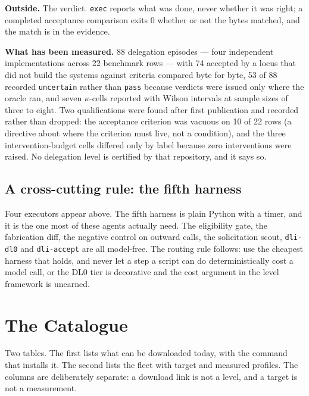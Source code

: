 \textbf{Outside.} The verdict. \texttt{exec} reports what was done, never whether it was right; a completed acceptance comparison exits 0 whether or not the bytes matched, and the match is in the evidence.

\textbf{What has been measured.} 88 delegation episodes --- four independent implementations across 22 benchmark rows --- with 74 accepted by a locus that did not build the systems against criteria compared byte for byte, 53 of 88 recorded \texttt{uncertain} rather than \texttt{pass} because verdicts were issued only where the oracle ran, and seven $\kappa$-cells reported with Wilson intervals at sample sizes of three to eight. Two qualifications were found after first publication and recorded rather than dropped: the acceptance criterion was vacuous on 10 of 22 rows (a directive about where the criterion must live, not a condition), and the three intervention-budget cells differed only by label because zero interventions were raised. No delegation level is certified by that repository, and it says so.

\subsection{A cross-cutting rule: the fifth harness}

Four executors appear above. The fifth harness is plain Python with a timer, and it is the one most of these agents actually need. The eligibility gate, the fabrication diff, the negative control on outward calls, the solicitation scout, \texttt{dli-dl0} and \texttt{dli-accept} are all model-free. The routing rule follows: use the cheapest harness that holds, and never let a step a script can do deterministically cost a model call, or the DL0 tier is decorative and the cost argument in the level framework is unearned.

\section{The Catalogue}\label{sec:catalogue}

Two tables. The first lists what can be downloaded today, with the command that installs it. The second lists the fleet with target and measured profiles. The columns are deliberately separate: a download link is not a level, and a target is not a measurement.

